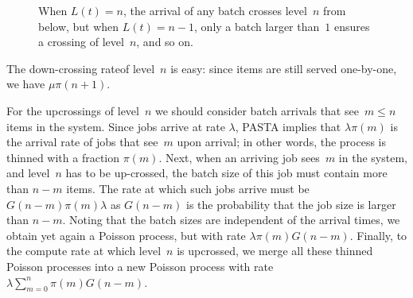 \documentclass[queueing-book.tex]{subfiles}
\begin{document}
\begin{figure}[t]
\centering
{}

\caption{When $L(t)=n$, the arrival of any batch crosses level~$n$ from below, but when $L(t)=n-1$, only a batch larger than~$1$ ensures a crossing of level~$n$, and so on.} \label{fig:levelcrossing}
\end{figure}

The down-crossing rateof level~$n$ is easy: since items are still served one-by-one, we have $\mu \pi(n+1)$.

For the upcrossings of level~$n$ we should consider batch arrivals that see~$m\leq n$ items in the system.
Since jobs arrive at rate $\lambda$, PASTA implies that $\lambda \pi(m)$ is the arrival rate of jobs that see~$m$ upon arrival; in other words, the process is thinned with a fraction $\pi(m)$.
Next, when an arriving job sees~$m$ in the system, and level~$n$ has to be up-crossed, the batch size of this job must contain more than $n-m$ items.
The rate at which such jobs arrive must be $G(n-m)\pi(m)\lambda$ as $G(n-m)$ is the probability that the job size is larger than $n-m$.
Noting that the batch sizes are independent of the arrival times, we obtain yet again a Poisson process, but with rate $\lambda \pi(m) G(n-m)$.
Finally, to the compute rate at which level~$n$ is upcrossed, we merge all these thinned Poisson processes into a new Poisson process with rate $\lambda \sum_{m=0}^n \pi(m) G(n-m)$.
\end{document}
